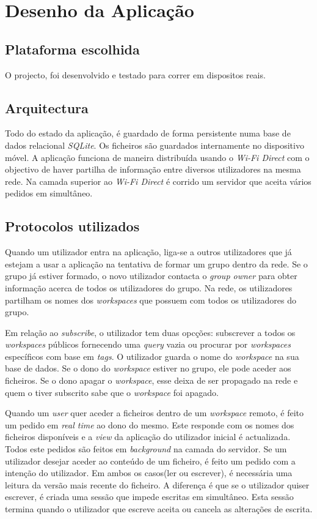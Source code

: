 \section{Desenho da Aplicação}

\subsection{Plataforma escolhida}
O projecto, foi desenvolvido e testado para correr em dispositos reais. 
\subsection{Arquitectura}
Todo do estado da aplicação, é guardado de forma persistente numa base de dados relacional \textit{SQLite}. Os ficheiros são guardados internamente no dispositivo móvel. A aplicação funciona de maneira distribuída usando o \textit{Wi-Fi Direct} com o objectivo de haver partilha de informação entre diversos utilizadores na mesma rede. Na camada superior ao \textit{Wi-Fi Direct} é corrido um servidor que aceita vários pedidos em simultâneo.
\subsection{Protocolos utilizados}
Quando um utilizador entra na aplicação, liga-se a outros utilizadores que já estejam a usar a aplicação na tentativa de formar um grupo dentro da rede. Se o grupo já estiver formado, o novo utilizador contacta o \textit{group owner} para obter informação acerca de todos os utilizadores do grupo. Na rede, os utilizadores partilham os nomes dos \textit{workspaces} que possuem com todos os utilizadores do grupo.

Em relação ao \textit{subscribe}, o utilizador tem duas opcções: subscrever a todos os \textit{workspaces} públicos fornecendo uma \textit{query} vazia ou procurar por \textit{workspaces} específicos com base em \textit{tags}. O utilizador guarda o nome do \textit{workspace} na sua base de dados. Se o dono do \textit{workspace} estiver no grupo, ele pode aceder aos ficheiros. Se o dono apagar o \textit{workspace}, esse deixa de ser propagado na rede e quem o tiver subscrito sabe que o \textit{workspace} foi apagado.

Quando um \textit{user} quer aceder a ficheiros dentro de um \textit{workspace} remoto, é feito um pedido em \textit{real time} ao dono do mesmo. Este responde com os nomes dos ficheiros disponíveis e a \textit{view} da aplicação do utilizador inicial é actualizada. Todos este pedidos são feitos em \textit{background} na camada do servidor. Se um utilizador desejar aceder ao conteúdo de um ficheiro, é feito um pedido com a intenção do utilizador. Em ambos os casos(ler ou escrever), é necessária uma leitura da versão mais recente do ficheiro. A diferença é que se o utilizador quiser escrever, é criada uma sessão que impede escritas em simultâneo. Esta sessão termina quando o utilizador que escreve aceita ou cancela as alterações de escrita.

